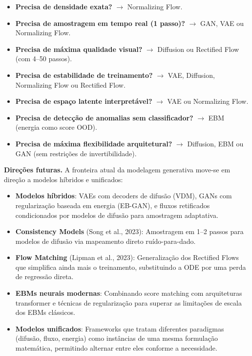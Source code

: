 \documentclass{tufte-handout}
\begin{document}
\begin{itemize}
    \item \textbf{Precisa de densidade exata?} $\rightarrow$ Normalizing Flow.
    \item \textbf{Precisa de amostragem em tempo real (1 passo)?} $\rightarrow$ GAN, VAE ou Normalizing Flow.
    \item \textbf{Precisa de máxima qualidade visual?} $\rightarrow$ Diffusion ou Rectified Flow (com 4--50 passos).
    \item \textbf{Precisa de estabilidade de treinamento?} $\rightarrow$ VAE, Diffusion, Normalizing Flow ou Rectified Flow.
    \item \textbf{Precisa de espaço latente interpretável?} $\rightarrow$ VAE ou Normalizing Flow.
    \item \textbf{Precisa de detecção de anomalias sem classificador?} $\rightarrow$ EBM (energia como score OOD).
    \item \textbf{Precisa de máxima flexibilidade arquitetural?} $\rightarrow$ Diffusion, EBM ou GAN (sem restrições de invertibilidade).
\end{itemize}

\medskip
\noindent\textbf{Direções futuras.}
A fronteira atual da modelagem generativa move-se em direção a modelos híbridos e unificados:

\begin{itemize}
    \item \textbf{Modelos híbridos}: VAEs com decoders de difusão (VDM), GANs com regularização baseada em energia (EB-GAN), e fluxos retificados condicionados por modelos de difusão para amostragem adaptativa.
    \item \textbf{Consistency Models} (Song et al., 2023): Amostragem em 1--2 passos para modelos de difusão via mapeamento direto ruído-para-dado.
    \item \textbf{Flow Matching} (Lipman et al., 2023): Generalização dos Rectified Flows que simplifica ainda mais o treinamento, substituindo a ODE por uma perda de regressão direta.
    \item \textbf{EBMs neurais modernas}: Combinando score matching com arquiteturas transformer e técnicas de regularização para superar as limitações de escala dos EBMs clássicos.
    \item \textbf{Modelos unificados}: Frameworks que tratam diferentes paradigmas (difusão, fluxo, energia) como instâncias de uma mesma formulação matemática, permitindo alternar entre eles conforme a necessidade.
\end{itemize}
\end{document}
